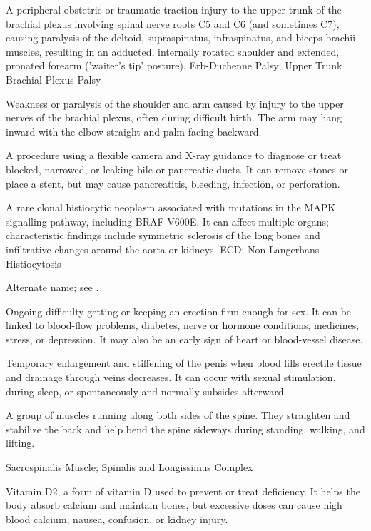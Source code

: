  A peripheral obstetric or traumatic traction injury to the upper trunk of the brachial plexus involving spinal nerve roots C5 and C6 (and sometimes C7), causing paralysis of the deltoid, supraspinatus, infraspinatus, and biceps brachii muscles, resulting in an adducted, internally rotated shoulder and extended, pronated forearm ('waiter's tip' posture).
\synonyms
Erb-Duchenne Palsy; Upper Trunk Brachial Plexus Palsy

 Weakness or paralysis of the shoulder and arm caused by injury to the upper nerves of the brachial plexus, often during difficult birth. The arm may hang inward with the elbow straight and palm facing backward.

 A procedure using a flexible camera and X-ray guidance to diagnose or treat blocked, narrowed, or leaking bile or pancreatic ducts. It can remove stones or place a stent, but may cause pancreatitis, bleeding, infection, or perforation.

 A rare clonal histiocytic neoplasm associated with mutations in the MAPK signalling pathway, including BRAF V600E. It can affect multiple organs; characteristic findings include symmetric sclerosis of the long bones and infiltrative changes around the aorta or kidneys.
\synonyms
ECD; Non-Langerhans Histiocytosis

 Alternate name; see .

 Ongoing difficulty getting or keeping an erection firm enough for sex. It can be linked to blood-flow problems, diabetes, nerve or hormone conditions, medicines, stress, or depression. It may also be an early sign of heart or blood-vessel disease.

 Temporary enlargement and stiffening of the penis when blood fills erectile tissue and drainage through veins decreases. It can occur with sexual stimulation, during sleep, or spontaneously and normally subsides afterward.

 A group of muscles running along both sides of the spine. They straighten and stabilize the back and help bend the spine sideways during standing, walking, and lifting.

\synonyms
Sacrospinalis Muscle; Spinalis and Longissimus Complex

 Vitamin D2, a form of vitamin D used to prevent or treat deficiency. It helps the body absorb calcium and maintain bones, but excessive doses can cause high blood calcium, nausea, confusion, or kidney injury.

